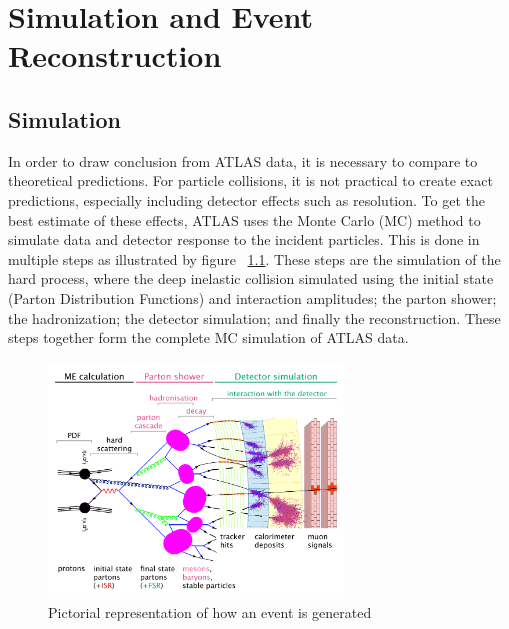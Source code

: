 \chapter{Simulation and Event Reconstruction}
\label{chap:EvtReco} 
\section{Simulation}
In order to draw conclusion from ATLAS data, it is necessary to compare to theoretical predictions. For particle collisions, it is not practical to create exact predictions, especially including detector effects such as resolution. To get the best estimate of these effects, ATLAS uses the Monte Carlo (MC) method to simulate data and detector response to the incident particles. This is done in multiple steps as illustrated by figure ~\ref{fig:eventsim}. These steps are the simulation of the hard process, where the deep inelastic collision simulated using the initial state (Parton Distribution Functions) and interaction amplitudes; the parton shower; the hadronization; the detector simulation; and finally the reconstruction. These steps together form the complete MC simulation of ATLAS data.\newline

\begin{figure}[h]
\begin{center}
\includegraphics*[width=0.70\textwidth] {figures/event_simulation}
\caption[Event generation cartoon]{Pictorial representation of how an event is generated \cite{Wanotayaroj:2242196}}
\label{fig:eventsim}
\end{center}
\end{figure}

